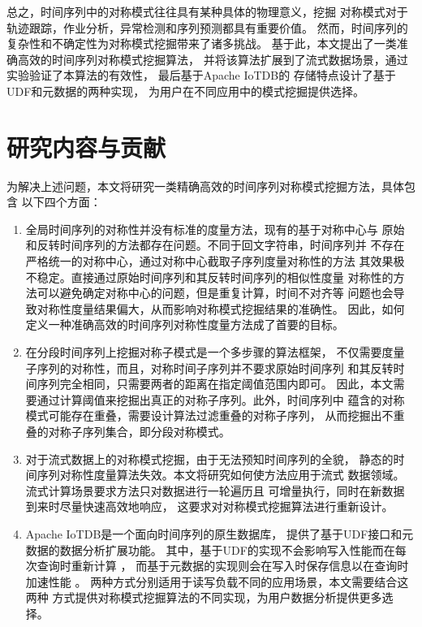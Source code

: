 总之，时间序列中的对称模式往往具有某种具体的物理意义，挖掘
对称模式对于轨迹跟踪，作业分析，异常检测和序列预测都具有重要价值。
然而，时间序列的复杂性和不确定性为对称模式挖掘带来了诸多挑战。
基于此，本文提出了一类准确高效的时间序列对称模式挖掘算法，
并将该算法扩展到了流式数据场景，通过实验验证了本算法的有效性，
最后基于Apache IoTDB\cite{10.14778/3415478.3415504}的
存储特点设计了基于UDF和元数据的两种实现，
为用户在不同应用中的模式挖掘提供选择。


\section{研究内容与贡献}
为解决上述问题，本文将研究一类精确高效的时间序列对称模式挖掘方法，具体包含
以下四个方面：
\begin{enumerate}
  \item 全局时间序列的对称性并没有标准的度量方法，现有的基于对称中心与
  原始和反转时间序列的方法都存在问题。不同于回文字符串，时间序列并
  不存在严格统一的对称中心，通过对称中心截取子序列度量对称性的方法
  其效果极不稳定。直接通过原始时间序列和其反转时间序列的相似性度量
  对称性的方法可以避免确定对称中心的问题，但是重复计算，时间不对齐等
  问题也会导致对称性度量结果偏大，从而影响对称模式挖掘结果的准确性。
  因此，如何定义一种准确高效的时间序列对称性度量方法成了首要的目标。
  \item 在分段时间序列上挖掘对称子模式是一个多步骤的算法框架，
  不仅需要度量子序列的对称性，而且，对称时间子序列并不要求原始时间序列
  和其反转时间序列完全相同，只需要两者的距离在指定阈值范围内即可。
  因此，本文需要通过计算阈值来挖掘出真正的对称子序列。此外，时间序列中
  蕴含的对称模式可能存在重叠，需要设计算法过滤重叠的对称子序列，
  从而挖掘出不重叠的对称子序列集合，即分段对称模式。
  \item 对于流式数据上的对称模式挖掘，由于无法预知时间序列的全貌，
  静态的时间序列对称性度量算法失效。本文将研究如何使方法应用于流式
  数据领域。流式计算场景要求方法只对数据进行一轮遍历且
  可增量执行，同时在新数据到来时尽量快速高效地响应，
  这要求对对称模式挖掘算法进行重新设计。
  \item Apache IoTDB是一个面向时间序列的原生数据库，
  提供了基于UDF接口和元数据的数据分析扩展功能。
  其中，基于UDF的实现不会影响写入性能而在每次查询时重新计算
  \cite{DBLP:journals/jiis/Castro-LopezBL20}，
  而基于元数据的实现则会在写入时保存信息以在查询时加速性能
  \cite{DBLP:phd/hal/Zhang19c}。
  两种方式分别适用于读写负载不同的应用场景，本文需要结合这两种
  方式提供对称模式挖掘算法的不同实现，为用户数据分析提供更多选择。
  
\end{enumerate}

